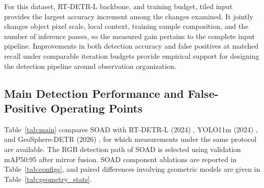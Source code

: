 \documentclass[11pt,a4paper]{article}
\begin{document}
For this dataset, RT-DETR-L backbone, and training budget, tiled input provides the largest accuracy increment among the changes examined. It jointly changes object pixel scale, local context, training sample composition, and the number of inference passes, so the measured gain pertains to the complete input pipeline. Improvements in both detection accuracy and false positives at matched recall under comparable iteration budgets provide empirical support for designing the detection pipeline around observation organization.

\subsection{Main Detection Performance and False-Positive Operating Points}
Table~\ref{tab:main} compares SOAD with RT-DETR-L (2024) \cite{rtdetr}, YOLO11m (2024) \cite{yolo11}, and GeoSphere-DETR (2026) \cite{geosphere}, for which measurements under the same protocol are available. The RGB detection path of SOAD is selected using validation mAP50:95 after mirror fusion. SOAD component ablations are reported in Table~\ref{tab:configs}, and paired differences involving geometric models are given in Table~\ref{tab:geometry_stats}.
\end{document}
